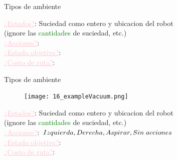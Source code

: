 \documentclass{beamer}
\theoremstyle{definition}
\theoremstyle{theorem}
\theoremstyle{remark}
\begin{document}
\begin{frame}{Tipos de ambiente}
    \small{
        \textcolor{Pink}{\underline{¿Estados?}}: Suciedad como entero y ubicacion del robot \\          \hspace{1.8cm} (ignore las \textcolor{Green}{cantidades} de suciedad, etc.) \\
        \textcolor{Pink}{\underline{¿Acciones?}}: \\
        \textcolor{Pink}{\underline{¿Estado objetivo?}}: \\
        \textcolor{Pink}{\underline{¿Costo de ruta?}}: 
    }
    \break\break\break\break\break
\end{frame}




\begin{frame}{Tipos de ambiente}
    \begin{figure}\texttt{[image: 16\_exampleVacuum.png]}\end{figure}
    \small{
        \textcolor{Pink}{\underline{¿Estados?}}: Suciedad como entero y ubicacion del robot \\          \hspace{1.8cm} (ignore las \textcolor{Green}{cantidades} de suciedad, etc.) \\
        \textcolor{Pink}{\underline{¿Acciones?}}: \textcolor{Purple}{$Izquierda, Derecha, Aspirar, %
            Sin \hspace{0.1cm}acciones$} \\
        \textcolor{Pink}{\underline{¿Estado objetivo?}}: \\
        \textcolor{Pink}{\underline{¿Costo de ruta?}}: 
    }
    \break\break\break\break\break
\end{frame}
\end{document}
